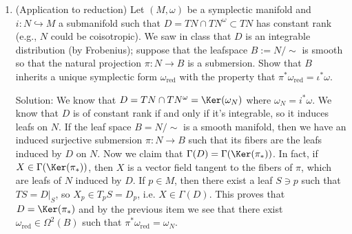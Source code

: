 \begin{example}
\begin{enumerate}
    \item[(c)] (Application to reduction) Let $(M,\omega)$ be a symplectic manifold and $i : N \hookrightarrow M$ a 
    submanifold such that $D = TN \cap TN^\omega \subset TN$ has constant rank (e.g., $N$ could be coisotropic). 
    We saw in class that $D$ is an integrable distribution (by Frobenius); suppose that the leafspace $B := N/\sim$ 
    is smooth so that the natural projection $\pi : N \to B$ is a submersion. Show that $B$ inherits a unique 
    symplectic form $\omega_{\text{red}}$ with the property that $\pi^*\omega_{\text{red}} = \iota^*\omega$.\par
    Solution: We know that $D=TN\cap TN^\omega=\Ker(\omega_N)$ where $\omega_N=i^*\omega$. We know that $D$ is of constant rank 
    if and only if it's integrable, so it induces leafs on $N$. If the leaf space $B=N/\sim$ is a smooth manifold, then we have 
    an induced surjective submersion $\pi:N\to B$ such that its fibers are the leafs induced by $D$ on $N$. Now we claim that 
    $\Gamma(D)=\Gamma(\Ker(\pi_*))$. In fact, if $X\in\Gamma(\Ker(\pi_*))$, then $X$ is a vector field tangent to the fibers of $\pi$, 
    which are leafs of $N$ induced by $D$. If $p\in M$, then there exist a leaf $S\ni p$ such that $TS=D|_S$, so 
    $X_p\in T_pS=D_p$, i.e. $X\in\Gamma(D)$. This proves that $D=\Ker(\pi_*)$ and by the previous item we see that 
    there exist $\omega_{\text{red}}\in\Omega^2(B)$ such that $\pi^*\omega_{\text{red}}=\omega_N$.
\end{enumerate}
\end{example}

